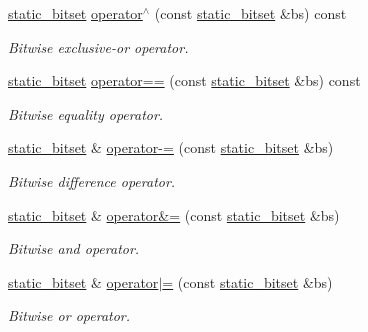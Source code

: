 \begin{DoxyCompactItemize}
\hyperlink{classlgraph_1_1utils_1_1static__bitset}{static\-\_\-bitset} \hyperlink{classlgraph_1_1utils_1_1static__bitset_ad1073ab23820db5711c279ef5d3fce67}{operator$^\wedge$} (const \hyperlink{classlgraph_1_1utils_1_1static__bitset}{static\-\_\-bitset} \&bs) const 
\begin{DoxyCompactList}\small\item\em Bitwise {\itshape exclusive-\/or} operator. \end{DoxyCompactList}\item 
\hyperlink{classlgraph_1_1utils_1_1static__bitset}{static\-\_\-bitset} \hyperlink{classlgraph_1_1utils_1_1static__bitset_a8217792890f175c8f83ca5c9aae96b34}{operator==} (const \hyperlink{classlgraph_1_1utils_1_1static__bitset}{static\-\_\-bitset} \&bs) const 
\begin{DoxyCompactList}\small\item\em Bitwise {\itshape equality} operator. \end{DoxyCompactList}\item 
\hyperlink{classlgraph_1_1utils_1_1static__bitset}{static\-\_\-bitset} \& \hyperlink{classlgraph_1_1utils_1_1static__bitset_af4f4a29642e50b6efa406d5f772a0e69}{operator-\/=} (const \hyperlink{classlgraph_1_1utils_1_1static__bitset}{static\-\_\-bitset} \&bs)
\begin{DoxyCompactList}\small\item\em Bitwise {\itshape difference} operator. \end{DoxyCompactList}\item 
\hyperlink{classlgraph_1_1utils_1_1static__bitset}{static\-\_\-bitset} \& \hyperlink{classlgraph_1_1utils_1_1static__bitset_aa85ff92bfb53eb3ed2fb2e1bc932ac98}{operator\&=} (const \hyperlink{classlgraph_1_1utils_1_1static__bitset}{static\-\_\-bitset} \&bs)
\begin{DoxyCompactList}\small\item\em Bitwise {\itshape and} operator. \end{DoxyCompactList}\item 
\hyperlink{classlgraph_1_1utils_1_1static__bitset}{static\-\_\-bitset} \& \hyperlink{classlgraph_1_1utils_1_1static__bitset_a62330084392296754cfc5e525d99cab2}{operator$\vert$=} (const \hyperlink{classlgraph_1_1utils_1_1static__bitset}{static\-\_\-bitset} \&bs)
\begin{DoxyCompactList}\small\item\em Bitwise {\itshape or} operator. \end{DoxyCompactList}\item 

\end{DoxyCompactItemize}
